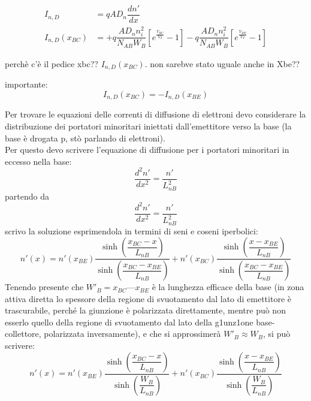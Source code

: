 \begin{align}
    I_{n,D}&=qAD_n \dfrac{dn'}{dx}\\
    I_{n,D}(x_{BC})&=+q \dfrac{AD_n n_i^2}{N_{AB} W_B} \left[ e^{\frac{V_{BC}}{V_T}}-1\right] -q \dfrac{AD_n n_i^2}{N_{AB} W_B} \left[ e^{\frac{V_{BE}}{V_T}}-1\right] 
\end{align}
\begin{ricevimento}
    perchè c'è il pedice xbc?? $I_{n,D}(x_{BC})$. non sarebve stato uguale anche in Xbe??
\end{ricevimento}
%
importante:
%
\begin{equation}
    I_{n,D}(x_{BC})=-I_{n,D}(x_{BE})
\end{equation}
%
\begin{exbox}
Per trovare le equazioni delle correnti di diffusione di elettroni devo considerare la distribuzione dei portatori minoritari iniettati dall'emettitore verso la base (la base è drogata p, stò parlando di elettroni).\\
Per questo devo scrivere l'equazione di diffusione per i portatori minoritari in eccesso nella base:
\begin{equation}
    \dfrac{d^2n'}{dx^2}=\dfrac{n'}{L_{nB}^2}
\end{equation}
    partendo da
    \begin{equation*}
        \dfrac{d^2n'}{dx^2}=\dfrac{n'}{L_{nB}^2}
    \end{equation*}
    scrivo la soluzione esprimendola in termini di seni e coseni iperbolici:
    \begin{equation*}
        n'(x)=n'(x_{BE})\dfrac{\sinh{\left( \dfrac{x_{BC}-x}{L_{nB}}\right)}}{\sinh{\left( \dfrac{x_{BC}-x_{BE}}{L_{nB}}\right)}}+ n'(x_{BC})\dfrac{\sinh{\left(\dfrac{x-x_{BE}}{L_{nB}}\right)}}{\sinh{\left( \dfrac{x_{BC}-x_{BE}}{L_{nB}}\right)}}
    \end{equation*}
    Tenendo presente che $ W'_B= x_{BC} — x_{BE}$ è la lunghezza efficace della base (in zona attiva diretta lo spessore della regione di svuotamento dal lato di emettitore è trascurabile, perché la giunzione è polarizzata direttamente, mentre può non esserlo quello della regione di svuotamento dal lato della g1unz1one base-collettore, polarizzata inversamente), e che si approssimerà $W'_B \approx W_B$, si può scrivere: 
    \begin{equation*}
         n'(x)=n'(x_{BE})\dfrac{\sinh{\left( \dfrac{x_{BC}-x}{L_{nB}}\right)}}{\sinh{\left( \dfrac{W_B}{L_{nB}}\right)}}+ n'(x_{BC})\dfrac{\sinh{\left(\dfrac{x-x_{BE}}{L_{nB}}\right)}}{\sinh{\left( \dfrac{W_B}{L_{nB}}\right)}}

\end{equation*}
\end{exbox}
